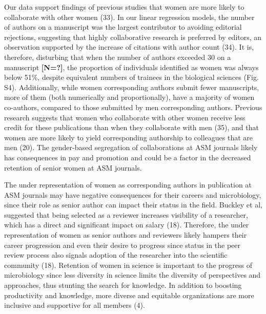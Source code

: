 \documentclass[11pt,]{article}
\begin{document}
Our data support findings of previous studies that women are more likely
to collaborate with other women (33). In our linear regression models,
the number of authors on a manuscript was the largest contributor to
avoiding editorial rejections, suggesting that highly collaborative
research is preferred by editors, an observation supported by the
increase of citations with author count (34). It is, therefore,
disturbing that when the number of authors exceeded 30 on a manuscript
\textbf{{[}N=?{]}}, the proportion of individuals identified as women
was always below 51\%, despite equivalent numbers of trainees in the
biological sciences (Fig. S4). Additionally, while women corresponding
authors submit fewer manuscripts, more of them (both numerically and
proportionally), have a majority of women co-authors, compared to those
submitted by men corresponding authors. Previous research suggests that
women who collaborate with other women receive less credit for these
publications than when they collaborate with men (35), and that women
are more likely to yield corresponding authorship to colleagues that are
men (20). The gender-based segregation of collaborations at ASM journals
likely has consequences in pay and promotion and could be a factor in
the decreased retention of senior women at ASM journals.

The under representation of women as corresponding authors in
publication at ASM journals may have negative consequences for their
careers and microbiology, since their role as senior author can impact
their status in the field. Buckley et al, suggested that being selected
as a reviewer increases visibility of a researcher, which has a direct
and significant impact on salary (18). Therefore, the under
representation of women as senior authors and reviewers likely hampers
their career progression and even their desire to progress since status
in the peer review process also signals adoption of the researcher into
the scientific community (18). Retention of women in science is
important to the progress of microbiology since less diversity in
science limits the diversity of perspectives and approaches, thus
stunting the search for knowledge. In addition to boosting productivity
and knowledge, more diverse and equitable organizations are more
inclusive and supportive for all members (4).
\end{document}
